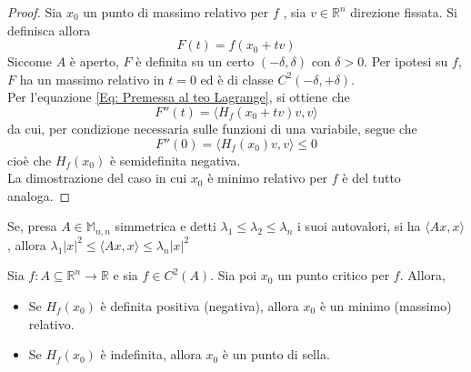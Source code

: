 \begin{proof}
    Sia $x_0$ un punto di massimo relativo per $f$ , sia $v \in \mathbb{R}^n$ direzione fissata. Si definisca allora
    \begin{equation}
    F(t)=f(x_0+tv)
    \end{equation}
    Siccome $A$ è aperto, $F$ è definita su un certo $\left(-\delta, \delta\right)$ con $\delta>0$. Per ipotesi su $f$, $F$ ha un massimo relativo in $t=0$ ed è di classe $C^2(-\delta, +\delta)$.\\
    Per l'equazione \eqref{Eq: Premessa al teo Lagrange}, si ottiene che
    \begin{equation}
        F''(t)= \langle H_f(x_0+tv)v, v \rangle 
    \end{equation}
    da cui, per condizione necessaria sulle funzioni di una variabile, segue che
    \begin{equation}
        F''(0)= \langle H_f(x_0)v, v \rangle \leq 0
    \end{equation}
    cioè che $H_f(x_0)$ è semidefinita negativa.\\
    La dimostrazione del caso in cui $x_0$ è minimo relativo per $f$ è del tutto analoga.
\end{proof}
\begin{lemma} \label{Lemma: FQ di matrice simmetrica è compresa tra i suoi autovalori max e min}
        Se, presa $A \in \mathbb{M}_{n,n}$ simmetrica e detti $\lambda_1 \leq \lambda_2 \leq \lambda_n$ i suoi autovalori, si ha $\langle Ax, x \rangle$, allora $\lambda_1 |x|^2 \leq \langle Ax, x \rangle \leq \lambda_n |x|^2$
\end{lemma}
\begin{theorem} \label{Teo: Condizione sufficiente del secondo ordine}
    Sia $f:A \subseteq \mathbb{R}^n \to \mathbb{R}$ e sia $f \in C^2(A)$. Sia poi $x_0$ un punto critico per $f$. Allora, 
    \begin{itemize}
        \item Se $H_f(x_0)$ è definita positiva (negativa), allora $x_0$ è un minimo (massimo) relativo.
        \item Se $H_f(x_0)$ è indefinita, allora $x_0$ è un punto di sella.
    \end{itemize}
\end{theorem}
